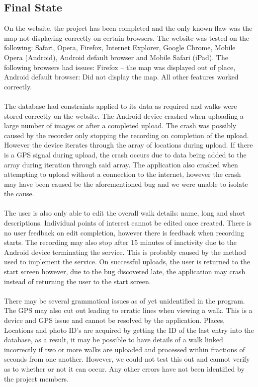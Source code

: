 \documentclass[12pt, portrait]{article}
\begin{document}
\subsection{Final State}
On the website, the project has been completed and the only known flaw was the map not displaying correctly on certain browsers. The website was tested on the following: Safari, Opera, Firefox, Internet Explorer, Google Chrome, Mobile Opera (Android), Android default browser and Mobile Safari (iPad). The following browsers had issues: Firefox – the map was displayed out of place, Android default browser: Did not display the map. All other features worked correctly.
\\\\
The database had constraints applied to its data as required and walks were stored correctly on the website. The Android device crashed when uploading a large number of images or after a completed upload. The crash was possibly caused by the recorder only stopping the recording on completion of the upload. However the device iterates through the array of locations during upload. If there is a GPS signal during upload, the crash occurs due to data being added to the array during iteration through said array. The application also crashed when attempting to upload without a connection to the internet, however the crash may have been caused be the aforementioned bug and we were unable to isolate the cause.
\\\\
The user is also only able to edit the overall walk details: name, long and short descriptions. Individual points of interest cannot be edited once created. There is no user feedback on edit completion, however there is feedback when recording starts. The recording may also stop after 15 minutes of inactivity due to the Android device terminating the service. This is probably caused by the method used to implement the service. On successful uploads, the user is returned to the start screen however, due to the bug discovered late, the application may crash instead of returning the user to the start screen. 
\\\\
There may be several grammatical issues as of yet unidentified in the program. The GPS may also cut out leading to erratic lines when viewing a walk. This is a device and GPS issue and cannot be resolved by the application. Places, Locations and photo ID’s are acquired by getting the ID of the last entry into the database, as a result, it may be possible to have details of a walk linked incorrectly if two or more walks are uploaded and processed within fractions of seconds from one another. However, we could not test this out and cannot verify as to whether or not it can occur. Any other errors have not been identified by the project members. 
\end{document}
